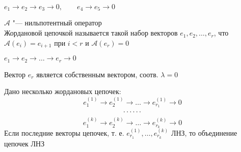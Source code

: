 \begin{notation}
	$ e_1 \to e_2 \to e_3 \to 0, \qquad e_4 \to e_5 \to 0 $
\end{notation}

\begin{definition}
	$ \mathcal{A} $ "--- нильпотентный оператор \\
	Жордановой цепочкой называется такой набор векторов $ e_1, e_2, \dots, e_r $, что $ \mathcal{A}(e_i) = e_{i + 1} $ при $ i < r $ и $ \mathcal{A}(e_r) = 0 $
\end{definition}

\begin{notation}
	$ e_1 \to e_2 \to \dots \to e_r \to 0 $
\end{notation}

\begin{remark}
	Вектор $ e_r $ является собственным вектором, соотв. $ \lambda = 0 $
\end{remark}

\begin{lemma}
	Дано несколько жордановых цепочек:
	$$ e_1^{(1)} \to e_2^{(1)} \to \dots \to e_{r_1}^{(1)} \to 0 $$
	$$ \widedots $$
	$$ e_1^{(k)} \to e_2^{(k)} \to \dots \to e_{r_k}^{(k)} \to 0 $$
	Если последние векторы цепочек, т. е. $ e_{r_1}^{(1)}, \dots, e_{r_k}^{(k)} $ ЛНЗ, то объединение цепочек ЛНЗ
\end{lemma}

